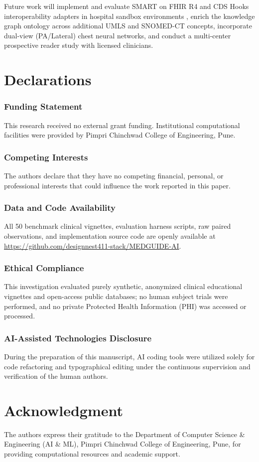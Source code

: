 \documentclass[journal,10pt,twocolumn]{IEEEtran}
\begin{document}
Future work will implement and evaluate SMART on FHIR R4 and CDS Hooks interoperability adapters in hospital sandbox environments \cite{hl7fhir2024, cdshooks2024}, enrich the knowledge graph ontology across additional UMLS and SNOMED-CT concepts, incorporate dual-view (PA/Lateral) chest neural networks, and conduct a multi-center prospective reader study with licensed clinicians.

\section*{Declarations}

\subsubsection*{Funding Statement}
This research received no external grant funding. Institutional computational facilities were provided by Pimpri Chinchwad College of Engineering, Pune.

\subsubsection*{Competing Interests}
The authors declare that they have no competing financial, personal, or professional interests that could influence the work reported in this paper.

\subsubsection*{Data and Code Availability}
All 50 benchmark clinical vignettes, evaluation harness scripts, raw paired observations, and implementation source code are openly available at \url{https://github.com/designnest411-stack/MEDGUIDE-AI}.

\subsubsection*{Ethical Compliance}
This investigation evaluated purely synthetic, anonymized clinical educational vignettes and open-access public databases; no human subject trials were performed, and no private Protected Health Information (PHI) was accessed or processed.

\subsubsection*{AI-Assisted Technologies Disclosure}
During the preparation of this manuscript, AI coding tools were utilized solely for code refactoring and typographical editing under the continuous supervision and verification of the human authors.

\section*{Acknowledgment}
The authors express their gratitude to the Department of Computer Science \& Engineering (AI \& ML), Pimpri Chinchwad College of Engineering, Pune, for providing computational resources and academic support.

\balance


\end{document}
